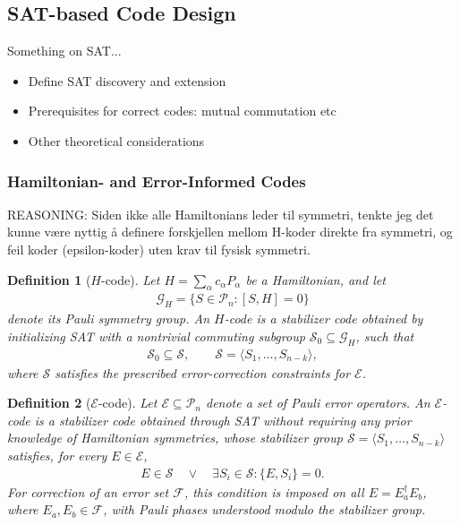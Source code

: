 \documentclass[amssymb,twocolumn,aps]{revtex4-2}
\newtheorem{definition}{Definition}[section]
\begin{document}
\subsection{SAT-based Code Design}
Something on SAT...\\
\begin{itemize}
    \item Define SAT discovery and extension
    \item Prerequisites for correct codes: mutual commutation etc
    \item Other theoretical considerations
\end{itemize}

\subsubsection{Hamiltonian- and Error-Informed Codes}
REASONING: Siden ikke alle Hamiltonians leder til symmetri, tenkte jeg det kunne være nyttig å definere forskjellen mellom H-koder direkte fra symmetri, og feil koder (epsilon-koder) uten krav til fysisk symmetri.
\begin{definition}[$H$-code]
Let $H=\sum_{\alpha}c_{\alpha}P_{\alpha}$ be a
Hamiltonian, and let
\begin{align*}
    \mathcal{G}_H
    =\{S\in\mathcal{P}_n:[S,H]=0\}
\end{align*}
denote its Pauli symmetry group.
An $H$-code is a stabilizer code obtained by
initializing SAT with a nontrivial commuting
subgroup $\mathcal{S}_0\subseteq\mathcal{G}_H$,
such that
\begin{align*}
    \mathcal{S}_0\subseteq\mathcal{S},
    \qquad
    \mathcal{S}=\langle S_1,\ldots,S_{n-k}\rangle,
\end{align*}
where $\mathcal{S}$ satisfies the prescribed
error-correction constraints for $\mathcal{E}$.
\end{definition}


\begin{definition}[$\mathcal{E}$-code]
Let $\mathcal{E}\subseteq\mathcal{P}_n$ denote a set
of Pauli error operators. An $\mathcal{E}$-code is
a stabilizer code obtained through SAT without
requiring any prior knowledge of Hamiltonian
symmetries, whose stabilizer group
$\mathcal{S}=\langle S_1,\ldots,S_{n-k}\rangle$
satisfies, for every $E\in\mathcal{E}$,
\begin{align*}
    E\in\mathcal{S}
    \quad\lor\quad
    \exists S_i\in\mathcal{S}:
    \{E,S_i\}=0.
\end{align*}
For correction of an error set $\mathcal{F}$,
this condition is imposed on all
$E=E_a^\dagger E_b$, where
$E_a,E_b\in\mathcal{F}$, with Pauli phases
understood modulo the stabilizer group.
\end{definition}
\end{document}
